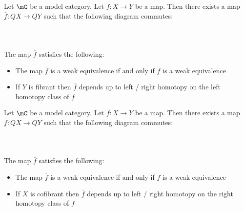 \documentclass[a4paper]{article}
\begin{document}
\begin{prp}{}{} Let $\mC$ be a model category. Let $f:X\to Y$ be a map. Then there exists a map $\overline{f}:QX\to QY$ such that the following diagram commutes: \\~\\
\\~\\
The map $\overline{f}$ satisfies the following: 
\begin{itemize}
\item The map $\overline{f}$ is a weak equivalence if and only if $f$ is a weak equivalence
\item If $Y$ is fibrant then $\overline{f}$ depends up to left / right homotopy on the left homotopy class of $f$
\end{itemize}
\end{prp}

\begin{prp}{}{} Let $\mC$ be a model category. Let $f:X\to Y$ be a map. Then there exists a map $\overline{f}:QX\to QY$ such that the following diagram commutes: \\~\\
\\~\\
The map $\overline{f}$ satisfies the following: 
\begin{itemize}
\item The map $\overline{f}$ is a weak equivalence if and only if $f$ is a weak equivalence
\item If $X$ is cofibrant then $\overline{f}$ depends up to left / right homotopy on the right homotopy class of $f$
\end{itemize}
\end{prp}
\end{document}
